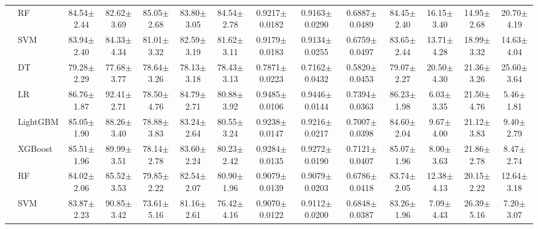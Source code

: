 \begin{tabular}{@{}llcccccccccccc@{}}
 & RF & 84.54{\tiny$\pm$2.44} & 82.62{\tiny$\pm$3.69} & 85.05{\tiny$\pm$2.68} & 83.80{\tiny$\pm$3.05} & 84.54{\tiny$\pm$2.78} & 0.9217{\tiny$\pm$0.0182} & 0.9163{\tiny$\pm$0.0290} & 0.6887{\tiny$\pm$0.0489} & 84.45{\tiny$\pm$2.40} & 16.15{\tiny$\pm$3.40} & 14.95{\tiny$\pm$2.68} & 20.70{\tiny$\pm$4.19}\\
 & SVM & 83.94{\tiny$\pm$2.40} & 84.33{\tiny$\pm$4.34} & 81.01{\tiny$\pm$3.32} & 82.59{\tiny$\pm$3.19} & 81.62{\tiny$\pm$3.11} & 0.9179{\tiny$\pm$0.0183} & 0.9134{\tiny$\pm$0.0255} & 0.6759{\tiny$\pm$0.0497} & 83.65{\tiny$\pm$2.44} & 13.71{\tiny$\pm$4.28} & 18.99{\tiny$\pm$3.32} & 14.63{\tiny$\pm$4.04}\\
 & DT & 79.28{\tiny$\pm$2.29} & 77.68{\tiny$\pm$3.77} & 78.64{\tiny$\pm$3.26} & 78.13{\tiny$\pm$3.18} & 78.43{\tiny$\pm$3.13} & 0.7871{\tiny$\pm$0.0223} & 0.7162{\tiny$\pm$0.0432} & 0.5820{\tiny$\pm$0.0453} & 79.07{\tiny$\pm$2.27} & 20.50{\tiny$\pm$4.30} & 21.36{\tiny$\pm$3.26} & 25.60{\tiny$\pm$3.64}\\
\midrule
{} & LR & 86.76{\tiny$\pm$1.87} & 92.41{\tiny$\pm$2.71} & 78.50{\tiny$\pm$4.76} & 84.79{\tiny$\pm$2.71} & 80.88{\tiny$\pm$3.92} & 0.9485{\tiny$\pm$0.0106} & 0.9446{\tiny$\pm$0.0144} & 0.7394{\tiny$\pm$0.0363} & 86.23{\tiny$\pm$1.98} & 6.03{\tiny$\pm$3.35} & 21.50{\tiny$\pm$4.76} & 5.46{\tiny$\pm$1.81}\\
 & LightGBM & 85.05{\tiny$\pm$1.90} & 88.26{\tiny$\pm$3.40} & 78.88{\tiny$\pm$3.83} & 83.24{\tiny$\pm$2.64} & 80.55{\tiny$\pm$3.24} & 0.9238{\tiny$\pm$0.0147} & 0.9216{\tiny$\pm$0.0217} & 0.7007{\tiny$\pm$0.0398} & 84.60{\tiny$\pm$2.04} & 9.67{\tiny$\pm$4.00} & 21.12{\tiny$\pm$3.83} & 9.40{\tiny$\pm$2.79}\\
 & XGBoost & 85.51{\tiny$\pm$1.96} & 89.99{\tiny$\pm$3.51} & 78.14{\tiny$\pm$2.78} & 83.60{\tiny$\pm$2.24} & 80.23{\tiny$\pm$2.42} & 0.9284{\tiny$\pm$0.0135} & 0.9272{\tiny$\pm$0.0190} & 0.7121{\tiny$\pm$0.0407} & 85.07{\tiny$\pm$1.96} & 8.00{\tiny$\pm$3.63} & 21.86{\tiny$\pm$2.78} & 8.47{\tiny$\pm$2.74}\\
 & RF & 84.02{\tiny$\pm$2.06} & 85.52{\tiny$\pm$3.53} & 79.85{\tiny$\pm$2.22} & 82.54{\tiny$\pm$2.07} & 80.90{\tiny$\pm$1.96} & 0.9079{\tiny$\pm$0.0139} & 0.9079{\tiny$\pm$0.0203} & 0.6786{\tiny$\pm$0.0418} & 83.74{\tiny$\pm$2.05} & 12.38{\tiny$\pm$4.13} & 20.15{\tiny$\pm$2.22} & 12.64{\tiny$\pm$3.18}\\
 & SVM & 83.87{\tiny$\pm$2.23} & 90.85{\tiny$\pm$3.42} & 73.61{\tiny$\pm$5.16} & 81.16{\tiny$\pm$2.61} & 76.42{\tiny$\pm$4.16} & 0.9070{\tiny$\pm$0.0122} & 0.9112{\tiny$\pm$0.0200} & 0.6848{\tiny$\pm$0.0387} & 83.26{\tiny$\pm$1.96} & 7.09{\tiny$\pm$4.43} & 26.39{\tiny$\pm$5.16} & 7.20{\tiny$\pm$3.07}\\

\end{tabular}
